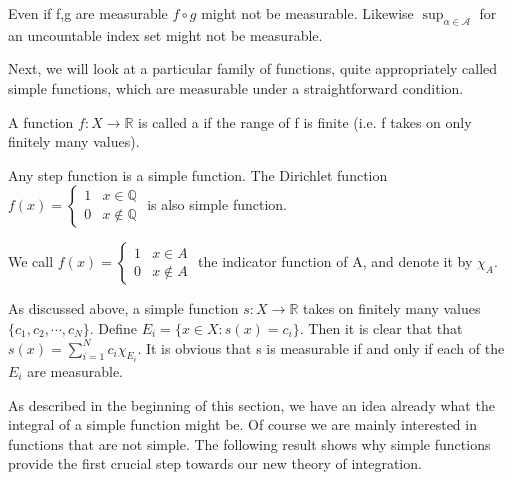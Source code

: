 \documentclass[11pt]{scrartcl}
\begin{document}
\begin{remark}
Even if f,g are measurable $f \circ g$ might not be measurable. Likewise $\sup_{\alpha \in \mathscr{A}} $ for an uncountable index set might not be measurable.
\end{remark}

Next, we will look at a particular family of functions, quite appropriately called simple functions, which are measurable under a straightforward condition.

\begin{definition} A function $f: X \rightarrow \mathbb{R}$ is called a  if the range of f is finite (i.e. f takes on only finitely many values).
\end{definition}

\begin{example}
Any step function is a simple function. The Dirichlet function $f(x) = \begin{cases}
1 & x \in \mathbb{Q} \\
0 & x \notin \mathbb{Q} 
\end{cases}$ is also simple function.
\end{example}

\begin{definition}
We call $f(x) = \begin{cases}
1 & x \in A \\
0 & x \notin A 
\end{cases}$ the indicator function of A, and denote it by $\chi_A$.
\end{definition}

\begin{remark}
As discussed above, a simple function $s: X \rightarrow \mathbb{R}$ takes on finitely many values $\{c_1, c_2, \cdots, c_N\}$. Define $E_i = \{x\in X: s(x) = c_i\}$. Then it is clear that that $s(x) = \sum_{i=1}^N c_i \chi_{E_i}$. It is obvious that s is measurable if and only if each of the $E_i$ are measurable.
\end{remark}

As described in the beginning of this section, we have an idea already what the integral of a simple function might be. Of course we are mainly interested in functions that are not simple. The following result shows why simple functions provide the first crucial step towards our new theory of integration.
\end{document}
